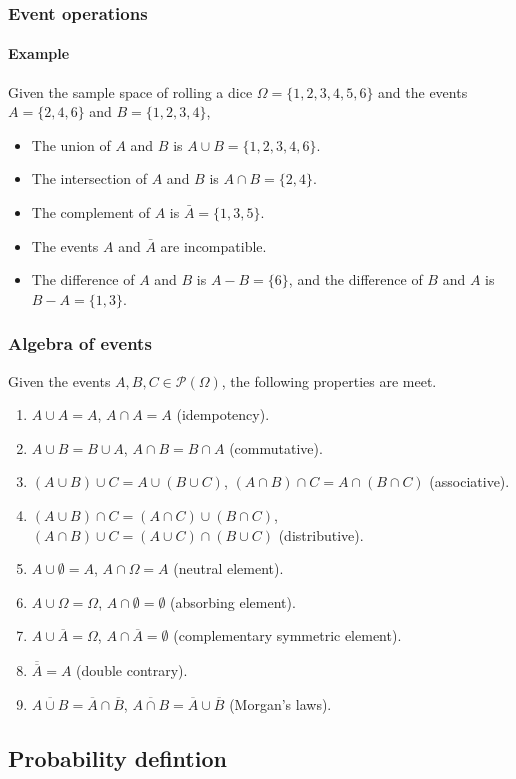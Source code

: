 \begin{frame}
\frametitle{Event operations}
\framesubtitle{Example}
Given the sample space of rolling a dice $\Omega=\{1,2,3,4,5,6\}$ and the events $A=\{2,4,6\}$ and $B=\{1,2,3,4\}$, 
\begin{itemize}
\item The union of $A$ and $B$ is $A\cup B=\{1,2,3,4,6\}$.
\item The intersection of $A$ and $B$ is $A\cap B=\{2,4\}$.
\item The complement of $A$ is $\bar A=\{1,3,5\}$.
\item The events $A$ and $\bar A$ are incompatible.
\item The difference of $A$ and $B$ is $A-B=\{6\}$, and the difference of $B$ and $A$ is $B-A=\{1,3\}$.
\end{itemize}
\end{frame}


\begin{frame}
\frametitle{Algebra of events}
Given the events $A,B,C\in  \mathcal{P}(\Omega)$, the following properties are meet. 
\begin{enumerate}
\item $A\cup A=A$, $A\cap A=A$ (idempotency).
\item $A\cup B=B\cup A$, $A\cap B = B\cap A$ (commutative).
\item $(A\cup B)\cup C = A\cup (B\cup C)$, $(A\cap B)\cap C = A\cap (B\cap C)$ (associative).
\item $(A\cup B)\cap C = (A\cap C)\cup (B\cap C)$, $(A\cap B)\cup C = (A\cup C)\cap (B\cup C)$ (distributive).
\item $A\cup \emptyset=A$, $A\cap \Omega=A$ (neutral element).
\item $A\cup \Omega=\Omega$, $A\cap \emptyset=\emptyset$ (absorbing element).
\item $A\cup \overline A = \Omega$, $A\cap \overline A= \emptyset$ (complementary symmetric element).
\item $\overline{\overline A} = A$ (double contrary).
\item $\overline{A\cup B} = \overline A\cap \overline B$, $\overline{A\cap B} = \overline A\cup \overline B$ (Morgan's
laws).
\end{enumerate}
\end{frame}


\subsection{Probability defintion}

